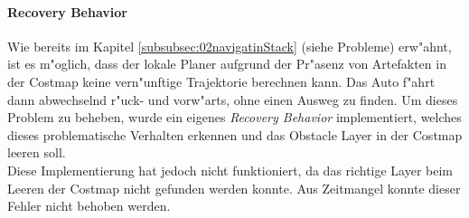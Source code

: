 \paragraph{Recovery Behavior}
Wie bereits im Kapitel \ref{subsubsec:02navigatinStack} (siehe Probleme) erw"ahnt, ist es m"oglich, dass der lokale Planer aufgrund der Pr"asenz von Artefakten in der Costmap keine vern"unftige Trajektorie berechnen kann. Das Auto f"ahrt dann abwechselnd r"uck- und vorw"arts, ohne einen Ausweg zu finden. Um dieses Problem zu beheben, wurde ein eigenes \emph{Recovery Behavior} implementiert, welches dieses problematische Verhalten erkennen und das Obstacle Layer in der Costmap leeren soll.\\
Diese Implementierung hat jedoch nicht funktioniert, da das richtige Layer beim Leeren der Costmap nicht gefunden werden konnte. Aus Zeitmangel konnte dieser Fehler nicht behoben werden.